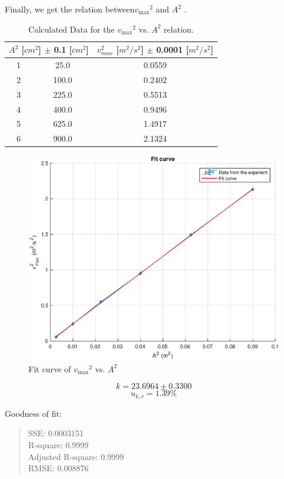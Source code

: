 Finally, we get the relation between$ {v_{\max}}^2$ and $A^2$ .

\begin{table}[H]
	\centering
	\begin{tabular}{|c|c|c|}
	\hline
	\multicolumn{2}{|c|}{$A^2$ [$cm^2$] $\pm$ 0.1 [$cm^2$]} 
	&  $v_{max}^2$ [$m^2/s^2$] $\pm$ 0.0001 [$m^2/s^2$] \\ \hline
	1  &  25.0 & 0.0559 \\ \hline
	2  & 100.0 & 0.2402 \\ \hline
	3  & 225.0 & 0.5513 \\ \hline
	4  & 400.0 & 0.9496 \\ \hline
	5  & 625.0 & 1.4917 \\ \hline
	6  & 900.0 & 2.1324 \\ \hline
	\end{tabular}
	\caption{Calculated Data for the $ {v_{\max}}^2$ vs. $A^2$ relation.}
\label{A2_v2}
\end{table}


\begin{figure}[H]
	\centering
	\includegraphics[width=13cm]{matlab/fitfig/av1}
	\caption{Fit curve of $ {v_{\max}}^2$ vs. $A^2$}
\end{figure}

$$ k =   23.6964 \pm 0.3300  $$
$$ u_{k,r} = 1.39 \% $$


Goodness of fit: 
\begin{quote}
	\centering
  SSE: 0.0003151 				\\
  R-square: 0.9999          	\\
  Adjusted R-square: 0.9999 	\\
  RMSE: 0.008876    			\\
\end{quote}



    
    
    
    
    
    

 
  
  
  
 





